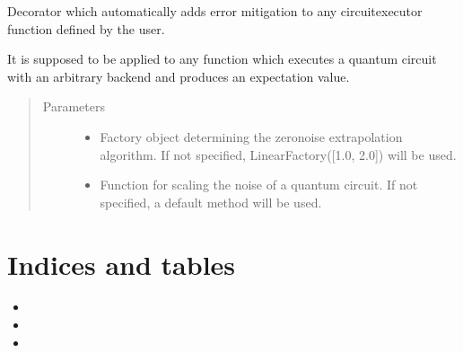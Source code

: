 \documentclass[letterpaper,10pt,english]{sphinxmanual}
\begin{document}
\begin{fulllineitems}
\label{\detokenize{index:mitiq.zne.zne_decorator}}
Decorator which automatically adds error mitigation to any circuit\sphinxhyphen{}executor function
defined by the user.

It is supposed to be applied to any function which executes a quantum circuit
with an arbitrary backend and produces an expectation value.
\begin{quote}\begin{description}
\item[{Parameters}] \leavevmode\begin{itemize}
\item {} 
 \sphinxhyphen{}\sphinxhyphen{} Factory object determining the zero\sphinxhyphen{}noise extrapolation algorithm.
If not specified, LinearFactory({[}1.0, 2.0{]}) will be used.

\item {} 
 \sphinxhyphen{}\sphinxhyphen{} Function for scaling the noise of a quantum circuit.
If not specified, a default method will be used.

\end{itemize}

\end{description}\end{quote}

\end{fulllineitems}



\chapter{Indices and tables}
\label{\detokenize{index:indices-and-tables}}\begin{itemize}
\item {} 

\item {} 

\item {} 

\end{itemize}
\end{document}
